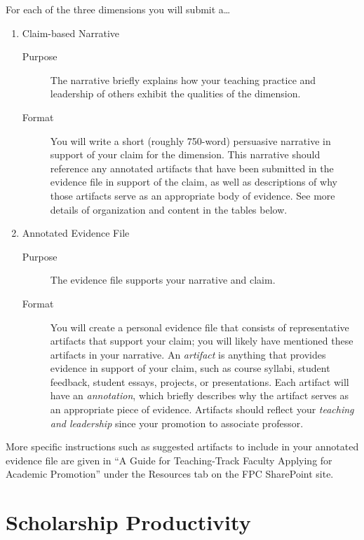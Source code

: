 \documentclass[11pt,titlepage]{article}
\begin{document}
For each of the three dimensions you will submit a\dots
\begin{enumerate}
  \item Claim-based Narrative
  \begin{description}
    \item[Purpose]
    The narrative briefly explains how your teaching practice and leadership of others exhibit the qualities of the dimension.

    \item[Format]
    You will write a short (roughly 750-word) persuasive narrative in support of your claim for the dimension.
    This narrative should reference any annotated artifacts that have been submitted in the evidence file in support of the claim, as well as descriptions of why those artifacts serve as an appropriate body of evidence.
    See more details of organization and content in the tables below.
  \end{description}

  \item Annotated Evidence File
  \begin{description}
    \item[Purpose]
    The evidence file supports your narrative and claim.

    \item[Format]
    You will create a personal evidence file that consists of representative artifacts that support your claim; you will likely have mentioned these artifacts in your narrative.
    An \emph{artifact} is anything that provides evidence in support of your claim, such as course syllabi, student feedback, student essays, projects, or presentations.
    Each artifact will have an \emph{annotation}, which briefly describes why the artifact serves as an appropriate piece of evidence.
    Artifacts should reflect your \emph{teaching and leadership} since your promotion to associate professor.
  \end{description}
\end{enumerate}

More specific instructions such as suggested artifacts to include in your annotated evidence file are given in ``A Guide for Teaching-Track Faculty Applying for Academic Promotion'' under the Resources tab on the \gls{FPC} SharePoint site.

\part{Scholarship Productivity}  %
\end{document}
